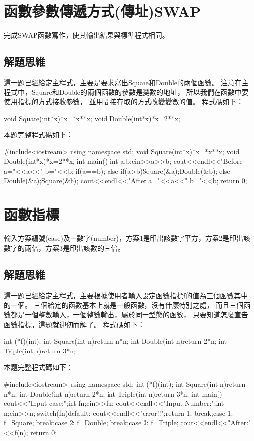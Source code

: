 \section{函數參數傳遞方式(傳址)SWAP}
完成SWAP函數寫作，使其輸出結果與標準程式相同。

\subsection{解題思維}
這一題已經給定主程式，主要是要求寫出Square和Double的兩個函數。
注意在主程式中，Square和Double的兩個函數的參數是變數的地址，
所以我們在函數中要使用指標的方式接收參數，
並用間接存取的方式改變變數的值。
程式碼如下：
\begin{inside}
void Square(int*x){*x=*x**x;}
void Double(int*x){*x=2**x;}
\end{inside}

本題完整程式碼如下：	
\begin{cppcode}
#include<iostream>
using namespace std;
void Square(int*x){*x=*x**x;}
void Double(int*x){*x=2**x;}
int main(){
	int a,b;cin>>a>>b;
	cout<<endl<<"Before a="<<a<<" b="<<b;
	if(a==b);
	else if(a>b){Square(&a);Double(&b);}
	else {Double(&a);Square(&b);}
	cout<<endl<<"After a="<<a<<" b="<<b;
	return 0;
}
\end{cppcode}


\section{函數指標}
輸入方案編號(case)及一數字(number)，方案1是印出該數字平方，方案2是印出該數字的兩倍，方案3是印出該數的三倍。

\subsection{解題思維}
這一題已經給定主程式，主要根據使用者輸入設定函數指標f的值為三個函數其中的一個。
三個給定的函數基本上就是一般函數，沒有什麼特別之處，
而且三個函數都是一個整數輸入，一個整數輸出，屬於同一型態的函數，
只要知道怎麼宣告函數指標，這題就迎仞而解了。
程式碼如下：
\begin{inside}
int (*f)(int);
int Square(int n){return n*n;}
int Double(int n){return 2*n;}
int Triple(int n){return 3*n;}
\end{inside}

本題完整程式碼如下：	
\begin{cppcode}
#include<iostream>
using namespace std;
int (*f)(int);
int Square(int n){return n*n;}
int Double(int n){return 2*n;}
int Triple(int n){return 3*n;}
int main(){
	cout<<"Input case:";int fn;cin>>fn;
	cout<<endl<<"Input Number:";int n;cin>>n;
	switch(fn){default:	cout<<endl<<"error!!";return 1;
		break;case 1:	f=Square;
		break;case 2:	f=Double;
		break;case 3:	f=Triple;
	}
	cout<<endl<<"After:"<<f(n);
	return 0;
}
\end{cppcode}


